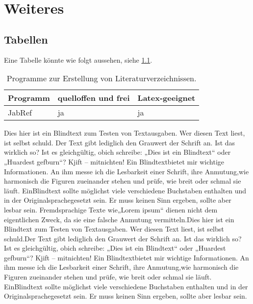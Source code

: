\chapter{Weiteres}

\section{Tabellen}
\label{sec:HFS_Wahrnehmung}

Eine Tabelle könnte wie folgt aussehen, siehe \cref{tab:programme}.

\begin{table}[hbt]
	\centering
	\caption{Programme zur Erstellung von Literaturverzeichnissen.}
	\label{tab:programme}
	\begin{tabular}{lll}
		\toprule
		Programm & quelloffen und frei & Latex-geeignet \\ \midrule
		JabRef   & ja                  & ja             \\ \bottomrule
	\end{tabular}
\end{table}

Dies hier ist ein Blindtext zum Testen von Textausgaben. Wer diesen Text liest, ist selbst schuld.
Der Text gibt lediglich den Grauwert der Schrift an. Ist das wirklich so? Ist es gleichgültig, obich schreibe:
„Dies ist ein Blindtext“ oder „Huardest gefburn“? Kjift – mitnichten! Ein Blindtextbietet mir wichtige Informationen. 
An ihm messe ich die Lesbarkeit einer Schrift, ihre Anmutung,wie harmonisch die Figuren zueinander stehen und prüfe, 
wie breit oder schmal sie läuft. EinBlindtext sollte möglichst viele verschiedene Buchstaben enthalten und in der 
Originalsprachegesetzt sein. Er muss keinen Sinn ergeben, sollte aber lesbar sein. Fremdsprachige Texte wie„Lorem ipsum“ 
dienen nicht dem eigentlichen Zweck, da sie eine falsche Anmutung vermitteln.Dies hier ist ein Blindtext zum Testen von 
Textausgaben. Wer diesen Text liest, ist selbst schuld.Der Text gibt lediglich den Grauwert der Schrift an. Ist das 
wirklich so? Ist es gleichgültig, obich schreibe: „Dies ist ein Blindtext“ oder „Huardest gefburn“? Kjift – mitnichten! 
Ein Blindtextbietet mir wichtige Informationen. An ihm messe ich die Lesbarkeit einer Schrift, ihre Anmutung,wie 
harmonisch die Figuren zueinander stehen und prüfe, wie breit oder schmal sie läuft. EinBlindtext sollte möglichst viele 
verschiedene Buchstaben enthalten und in der Originalsprachegesetzt sein. Er muss keinen Sinn ergeben, sollte aber lesbar 
sein.

